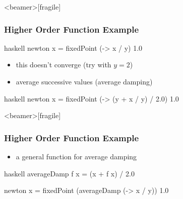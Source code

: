 \documentclass[dvipsnames]{beamer}
\theoremstyle{plain}
\begin{document}
\begin{frame}<beamer>[fragile]
  \frametitle{Higher Order Function Example}

  \begin{example}
    \begin{pygments}{haskell}
newton x = fixedPoint (\y -> x / y) 1.0
    \end{pygments}

    \pause
    \begin{itemize}
      \item this doesn't converge (try with $y = 2$)
      \item average successive values (average damping)
    \end{itemize}
    \begin{pygments}{haskell}
newton x = fixedPoint (\y -> (y + x / y) / 2.0) 1.0
    \end{pygments}
  \end{example}
\end{frame}

\begin{frame}<beamer>[fragile]
  \frametitle{Higher Order Function Example}

  \begin{example}
    \begin{itemize}
      \item a general function for average damping
    \end{itemize}
    \begin{pygments}{haskell}
averageDamp f x = (x + f x) / 2.0

newton x = fixedPoint (averageDamp (\y -> x / y)) 1.0
    \end{pygments}
  \end{example}
\end{frame}
%
%
%
\end{document}
